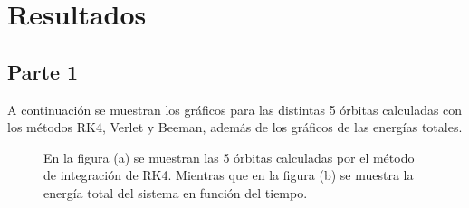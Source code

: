 \documentclass[letterpaper,oneside]{article}
\begin{document}
\newpage
\section{Resultados}
\subsection{Parte 1}
A continuación se muestran los gráficos para las distintas 5 órbitas calculadas con los métodos RK4, Verlet y Beeman, además de los gráficos de las energías totales.


\begin{figure}\centering
{}\hfill
{}\hfill

\caption{En la figura (a) se muestran las 5 órbitas calculadas por el método de integración de RK4. Mientras que en la figura (b) se muestra la energía total del sistema en función del tiempo. }
\label{RK4}
\end{figure}
\end{document}
